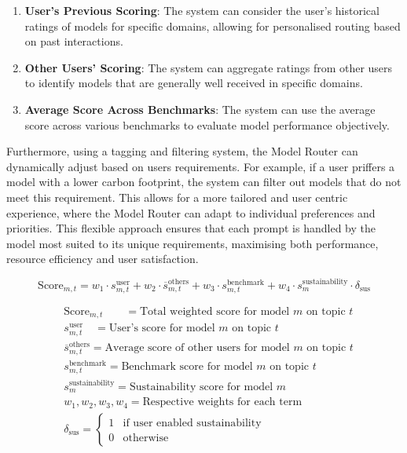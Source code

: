 \begin{enumerate}
    \item \textbf{User's Previous Scoring}: The system can consider the user's historical ratings of models for specific domains, allowing for personalised routing based on past interactions.
    \item \textbf{Other Users' Scoring}: The system can aggregate ratings from other users to identify models that are generally well received in specific domains.
    \item \textbf{Average Score Across Benchmarks}: The system can use the average score across various benchmarks to evaluate model performance objectively.
\end{enumerate}

Furthermore, using a tagging and filtering system, the Model Router can dynamically adjust based on users requirements. For example, if a user priffers a model with a lower carbon footprint, the system can filter out models that do not meet this requirement. This allows for a more tailored and user centric experience, where the Model Router can adapt to individual preferences and priorities. This flexible approach ensures that each prompt is handled by the model most suited to its unique requirements, maximising both performance, resource efficiency and user satisfaction.


\[
\text{Score}_{m,t} = w_1 \cdot s^{\text{user}}_{m,t} + w_2 \cdot \overline{s}^{\text{others}}_{m,t} + w_3 \cdot s^{\text{benchmark}}_{m,t} + w_4 \cdot s^{\text{sustainability}}_{m} \cdot \delta_{\text{sus}}
\]

\begin{align*}
&\text{Score}_{m,t} \quad\quad = \text{Total weighted score for model } m \text{ on topic } t \\
&s^{\text{user}}_{m,t} \quad = \text{User's score for model } m \text{ on topic } t \\
&\overline{s}^{\text{others}}_{m,t} = \text{Average score of other users for model } m \text{ on topic } t \\
&s^{\text{benchmark}}_{m,t} = \text{Benchmark score for model } m \text{ on topic } t \\
&s^{\text{sustainability}}_{m} = \text{Sustainability score for model } m \\
&w_1, w_2, w_3, w_4 = \text{Respective weights for each term} \\
&\delta_{\text{sus}} =
  \begin{cases}
    1 & \text{if user enabled sustainability} \\
    0 & \text{otherwise}
  \end{cases}
\end{align*}



